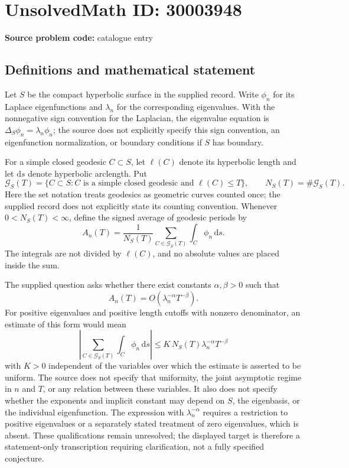 \documentclass[11pt]{article}
\begin{document}
\section*{UnsolvedMath ID: 30003948}
\textbf{Source problem code:} catalogue entry
\subsection{Definitions and mathematical statement}
Let \(S\) be the compact hyperbolic surface in the supplied record. Write \(\phi_n\) for its Laplace eigenfunctions and \(\lambda_n\) for the corresponding eigenvalues. With the nonnegative sign convention for the Laplacian, the eigenvalue equation is \(\Delta_S\phi_n=\lambda_n\phi_n\); the source does not explicitly specify this sign convention, an eigenfunction normalization, or boundary conditions if \(S\) has boundary.

For a simple closed geodesic \(C\subset S\), let \(\ell(C)\) denote its hyperbolic length and let \(\mathrm{d}s\) denote hyperbolic arclength. Put
\[
\mathcal G_S(T)=\{C\subset S:C\text{ is a simple closed geodesic and }\ell(C)\leq T\},\qquad N_S(T)=\#\mathcal G_S(T).
\]
Here the set notation treats geodesics as geometric curves counted once; the supplied record does not explicitly state its counting convention. Whenever \(0<N_S(T)<\infty\), define the signed average of geodesic periods by
\[
A_n(T)=\frac{1}{N_S(T)}\sum_{C\in\mathcal G_S(T)}\int_C\phi_n\,\mathrm{d}s.
\]
The integrals are not divided by \(\ell(C)\), and no absolute values are placed inside the sum.

The supplied question asks whether there exist constants \(\alpha,\beta>0\) such that
\[
A_n(T)=O\!\left(\lambda_n^{-\alpha}T^{-\beta}\right).
\]
For positive eigenvalues and positive length cutoffs with nonzero denominator, an estimate of this form would mean
\[
\left|\sum_{C\in\mathcal G_S(T)}\int_C\phi_n\,\mathrm{d}s\right|
\leq K\,N_S(T)\lambda_n^{-\alpha}T^{-\beta}
\]
with \(K>0\) independent of the variables over which the estimate is asserted to be uniform. The source does not specify that uniformity, the joint asymptotic regime in \(n\) and \(T\), or any relation between these variables. It also does not specify whether the exponents and implicit constant may depend on \(S\), the eigenbasis, or the individual eigenfunction. The expression with \(\lambda_n^{-\alpha}\) requires a restriction to positive eigenvalues or a separately stated treatment of zero eigenvalues, which is absent. These qualifications remain unresolved; the displayed target is therefore a statement-only transcription requiring clarification, not a fully specified conjecture.
\end{document}
